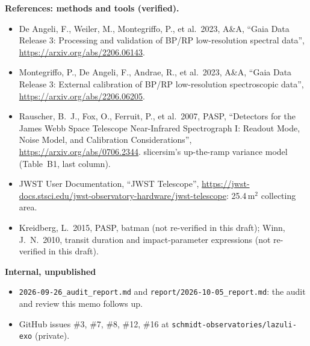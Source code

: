 \documentclass[11pt]{article}
\begin{document}
\textbf{References: methods and tools (verified).}
\begin{itemize}[leftmargin=*,itemsep=0pt]\small
  \item De Angeli, F., Weiler, M., Montegriffo, P., et al.\ 2023, A\&A, ``Gaia Data Release 3: Processing and validation of BP/RP low-resolution spectral data'', \url{https://arxiv.org/abs/2206.06143}.
  \item Montegriffo, P., De Angeli, F., Andrae, R., et al.\ 2023, A\&A, ``Gaia Data Release 3: External calibration of BP/RP low-resolution spectroscopic data'', \url{https://arxiv.org/abs/2206.06205}.
  \item Rauscher, B.~J., Fox, O., Ferruit, P., et al.\ 2007, PASP, ``Detectors for the James Webb Space Telescope Near-Infrared Spectrograph I: Readout Mode, Noise Model, and Calibration Considerations'', \url{https://arxiv.org/abs/0706.2344}. slicersim's up-the-ramp variance model (Table~B1, last column).
  \item JWST User Documentation, ``JWST Telescope'', \url{https://jwst-docs.stsci.edu/jwst-observatory-hardware/jwst-telescope}: 25.4\,m$^2$ collecting area.
  \item Kreidberg, L.\ 2015, PASP, batman (not re-verified in this draft); Winn, J.~N.\ 2010, transit duration and impact-parameter expressions (not re-verified in this draft).
\end{itemize}

\textbf{Internal, unpublished}
\begin{itemize}[leftmargin=*,itemsep=0pt]\small
  \item \texttt{2026-09-26\_audit\_report.md} and \texttt{report/2026-10-05\_report.md}: the audit and review this memo follows up.
  \item GitHub issues \#3, \#7, \#8, \#12, \#16 at \texttt{schmidt-observatories/lazuli-exo} (private).
\end{itemize}
\end{document}
